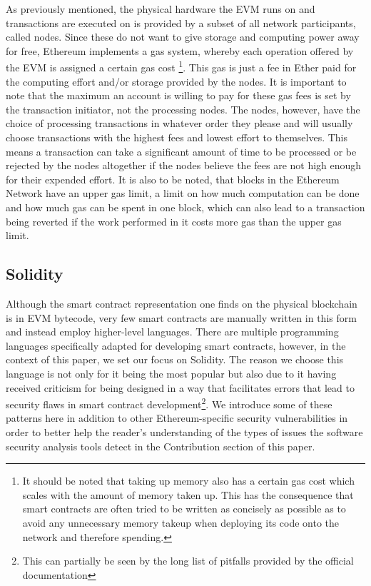 \documentclass[letterpaper,twocolumn,10pt]{article}
\begin{document}
As previously mentioned, the physical hardware the EVM runs on and transactions are executed on is provided by a subset of all network participants, called nodes. Since these do not want to give storage and computing power away for free, Ethereum implements a gas system, whereby each operation offered by the EVM is assigned a certain gas cost \footnote{It should be noted that taking up memory also has a certain gas cost which scales with the amount of memory taken up. This has the consequence that smart contracts are often tried to be written as concisely as possible as to avoid any unnecessary memory takeup when deploying its code onto the network and therefore spending.}. This gas is just a fee in Ether paid for the computing effort and/or storage provided by the nodes. It is important to note that the maximum an account is willing to pay for these gas fees is set by the transaction initiator, not the processing nodes. The nodes, however, have the choice of processing transactions in whatever order they please and will usually choose transactions with the highest fees and lowest effort to themselves. This means a transaction can take a significant amount of time to be processed or be rejected by the nodes altogether if the nodes believe the fees are not high enough for their expended effort. It is also to be noted, that blocks in the Ethereum Network have an upper gas limit, a limit on how much computation can be done and how much gas can be spent in one block, which can also lead to a transaction being reverted if the work performed in it costs more gas than the upper gas limit.

\subsection{Solidity}
\label{subsection:sol}
Although the smart contract representation one finds on the physical blockchain is in EVM bytecode, very few smart contracts are manually written in this form and instead employ higher-level languages. There are multiple programming languages specifically adapted for developing smart contracts, however, in the context of this paper, we set our focus on Solidity. The reason we choose this language is not only for it being the most popular \cite{gebele_2020} but also due to it having received criticism for being designed in a way that facilitates errors that lead to security flaws in smart contract development\footnote{This can partially be seen by the long list of pitfalls provided by the official documentation\cite{ethereumrevision0bbfe453}}. We introduce some of these patterns here in addition to other Ethereum-specific security vulnerabilities in order to better help the reader's understanding of the types of issues the software security analysis tools detect in the Contribution section of this paper.
\end{document}
